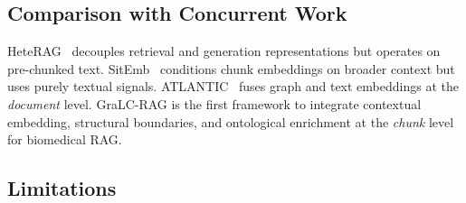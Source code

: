 \documentclass[sn-basic]{sn-jnl}
\newcommand{\gralcrag}{GraLC-RAG}
\begin{document}
\subsection{Comparison with Concurrent Work}

HeteRAG~\cite{yang2025heterag} decouples retrieval and generation representations but operates on pre-chunked text. SitEmb~\cite{wu2025sitemb} conditions chunk embeddings on broader context but uses purely textual signals. ATLANTIC~\cite{munikoti2023atlantic} fuses graph and text embeddings at the \emph{document} level. \gralcrag{} is the first framework to integrate contextual embedding, structural boundaries, and ontological enrichment at the \emph{chunk} level for biomedical RAG.

\subsection{Limitations}
\end{document}
